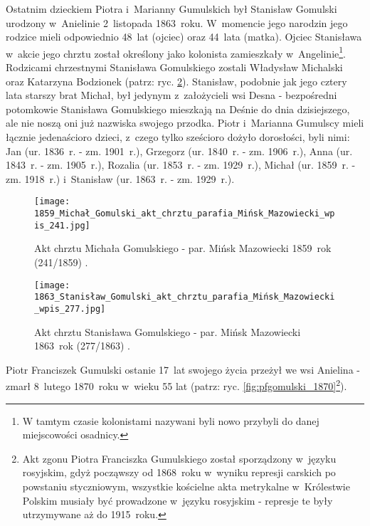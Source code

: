 Ostatnim dzieckiem Piotra i~Marianny Gumulskich był Stanisław Gomulski 
urodzony w~Anielinie 2~listopada 1863~roku. W~momencie jego narodzin jego 
rodzice mieli odpowiednio 48~lat (ojciec) oraz 44~lata (matka). Ojciec 
Stanisława w~akcie jego chrztu został określony jako kolonista zamieszkały 
w~Angelinie\footnote{W tamtym czasie kolonistami nazywani byli nowo przybyli 
do danej miejscowości osadnicy.}. Rodzicami chrzestnymi Stanisława Gomulskiego 
zostali Władysław Michalski oraz Katarzyna Bodzionek (patrz: ryc. 
\ref{fig:sgomulski_1863}). Stanisław, podobnie jak jego cztery lata starszy 
brat Michał, był jedynym z~założycieli wsi Desna - bezpośredni potomkowie 
Stanisława Gomulskiego mieszkają na Deśnie do dnia dzisiejszego, ale nie 
noszą oni już nazwiska swojego przodka. Piotr i~Marianna Gumulscy mieli 
łącznie jedenaścioro dzieci, z~czego tylko sześcioro dożyło dorosłości, byli 
nimi: Jan (ur. 1836~r. - zm. 1901~r.), Grzegorz (ur. 1840~r. - zm. 1906~r.), 
Anna (ur. 1843~r. - zm. 1905~r.), Rozalia (ur. 1853~r. - zm. 1929~r.), Michał 
(ur. 1859~r. - zm. 1918~r.) i~Stanisław (ur. 1863~r. - zm. 1929~r.).

\begin{figure}[!ht]
    \vspace*{0.5cm}
    \centering \texttt{[image: 
        1859\_Michał\_Gomulski\_akt\_chrztu\_parafia\_Mińsk\_Mazowiecki\_wpis\_241.jpg]}
    \captionsetup{format=hang}
    \caption{Akt chrztu Michała Gomulskiego - par. Mińsk Mazowiecki 1859~rok 
    (241/1859) \cite{par_minsk2}.}
    \label{fig:mgomulski_1859}
\end{figure}

\begin{figure}[!ht]
    \vspace*{0.5cm}
    \centering \texttt{[image: 
        1863\_Stanisław\_Gomulski\_akt\_chrztu\_parafia\_Mińsk\_Mazowiecki\_wpis\_277.jpg]}
    \captionsetup{format=hang}
    \caption{Akt chrztu Stanisława Gomulskiego - par. Mińsk Mazowiecki 
    1863~rok (277/1863) \cite{par_minsk2}.}
    \label{fig:sgomulski_1863}
\end{figure}

Piotr Franciszek Gumulski ostanie 17~lat swojego życia przeżył we wsi Anielina
 - zmarł 8~lutego 1870~roku w~wieku 55 lat (patrz: ryc.
 \ref{fig:pfgomulski_1870}\footnote{Akt zgonu Piotra Franciszka Gumulskiego 
 został sporządzony w~języku rosyjskim, gdyż począwszy od 1868~roku w~wyniku 
represji carskich po powstaniu styczniowym, wszystkie kościelne akta 
metrykalne w~Królestwie Polskim musiały być prowadzone w~języku rosyjskim - 
represje te były utrzymywane aż do 1915~roku.}). 

